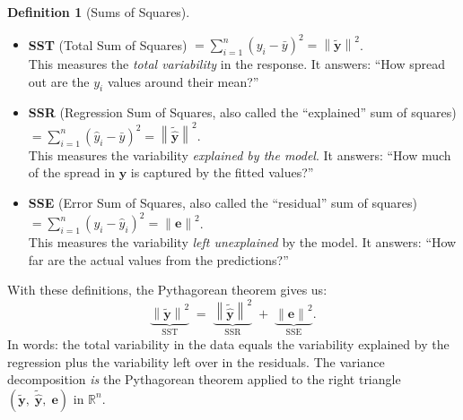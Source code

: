 \documentclass[11pt,a4paper]{article}
\theoremstyle{plain}
\theoremstyle{definition}
\newtheorem{definition}[theorem]{Definition}
\newcommand{\R}{\mathbb{R}}
\newcommand{\yhat}{\hat{\bm{y}}}
\newcommand{\by}{\bm{y}}
\newcommand{\be}{\bm{e}}
\newcommand{\norm}[1]{\left\lVert #1 \right\rVert}
\begin{document}
\begin{definition}[Sums of Squares]\label{def:sums-of-squares}
\leavevmode
\begin{itemize}[nosep]
  \item \textbf{SST} (Total Sum of Squares) $= \sum_{i=1}^n (y_i - \bar{y})^2 = \norm{\tilde{\by}}^2$.\\
    This measures the \emph{total variability} in the response.
    It answers: ``How spread out are the $y_i$ values around their mean?''
  \item \textbf{SSR} (Regression Sum of Squares, also called the ``explained'' sum of squares) $= \sum_{i=1}^n (\hat{y}_i - \bar{y})^2 = \norm{\tilde{\yhat}}^2$.\\
    This measures the variability \emph{explained by the model}.
    It answers: ``How much of the spread in $\by$ is captured by the fitted values?''
  \item \textbf{SSE} (Error Sum of Squares, also called the ``residual'' sum of squares) $= \sum_{i=1}^n (y_i - \hat{y}_i)^2 = \norm{\be}^2$.\\
    This measures the variability \emph{left unexplained} by the model.
    It answers: ``How far are the actual values from the predictions?''
\end{itemize}
\end{definition}

\noindent With these definitions, the Pythagorean theorem gives us:
\[
  \boxed{
  \underbrace{\norm{\tilde{\by}}^2}_{\text{SST}}
  \;=\;
  \underbrace{\norm{\tilde{\yhat}}^2}_{\text{SSR}}
  \;+\;
  \underbrace{\norm{\be}^2}_{\text{SSE}}.
  }
\]
In words: the total variability in the data equals the variability explained by the regression plus the variability left over in the residuals.
The variance decomposition \emph{is} the Pythagorean theorem applied to
the right triangle $(\tilde{\by},\;\tilde{\yhat},\;\be)$ in $\R^n$.
\end{document}
